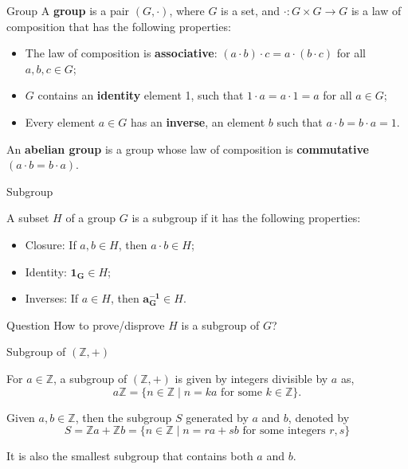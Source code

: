 \documentclass{beamer}
\begin{document}
\begin{frame}{Group}
    \hh A \textbf{group} is a pair $(G, \cdot)$, where $G$ is a set, and $\cdot : G \times G \to G$ is a law of composition that has the following properties:
    \begin{itemize}
        \item The law of composition is \textbf{associative}: $(a \cdot b) \cdot c = a \cdot (b \cdot c)$ for all $a, b, c \in G$;
        \item $G$ contains an \textbf{identity} element 1, such that $1 \cdot a = a \cdot 1 = a$ for all $a \in G$;
        \item Every element $a \in G$ has an \textbf{inverse}, an element $b$ such that $a \cdot b = b \cdot a = 1$.
    \end{itemize}
    \par \phantom{ji}
    \par 
    \hh An \textbf{abelian group} is a group whose law of composition is \textbf{commutative} $(a \cdot b = b \cdot a)$. 
\end{frame}
\begin{frame}{Subgroup}
    \par A subset $H$ of a group $G$ is a subgroup if it has the following properties:
    \begin{itemize}
        \item Closure: If $a, b \in H$, then $a \cdot b \in H$;
        \item Identity: $\mathbf{1_G} \in H$;
        \item Inverses: If $a \in H$, then $\mathbf{a^{-1}_G} \in H$.
    \end{itemize}
    \begin{block}{Question}
        \hh How to prove/disprove $H$ is a subgroup of $G$?
    \end{block}
\end{frame}
\begin{frame}{Subgroup of $(\mathbb{Z}, +)$}
    \par For $a \in \mathbb{Z}$, a subgroup of $(\mathbb{Z}, +)$ is given by integers divisible by $a$ as,
    $$
    a \mathbb{Z}=\{n \in \mathbb{Z} \mid n=k a \text { for some } k \in \mathbb{Z}\}.
    $$
    \par \phantom{ji}
    \par Given $a, b \in \mathbb{Z}$, then the subgroup $S$ generated by $a$ and $b$, denoted by
    $$
    S=\mathbb{Z} a+\mathbb{Z} b=\{n \in \mathbb{Z} \mid n=r a+s b \text { for some integers } r, s\}
    $$
    \par It is also the smallest subgroup that contains both $a$ and $b$.
\end{frame}
\end{document}
